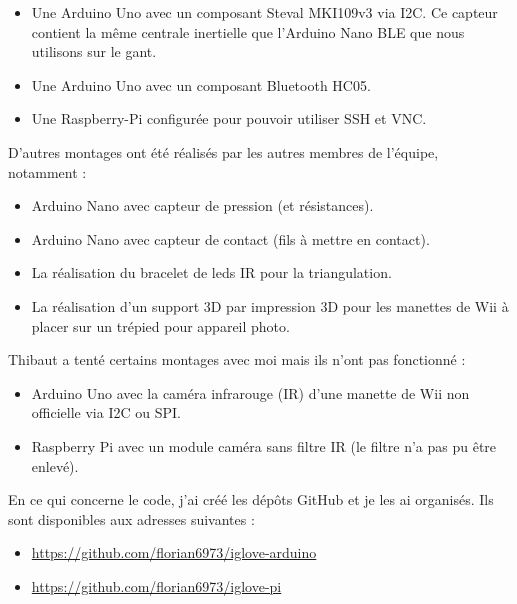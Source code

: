 \documentclass[10pt]{article}
\begin{document}
            \begin{itemize}
                \item Une Arduino Uno avec un composant Steval MKI109v3 via I2C.
                    Ce capteur contient la même centrale inertielle que l'Arduino Nano BLE que nous utilisons sur le gant.
                \item Une Arduino Uno avec un composant Bluetooth HC05.
                \item Une Raspberry-Pi configurée pour pouvoir utiliser SSH et VNC.
            \end{itemize}

            D'autres montages ont été réalisés par les autres membres de l'équipe, notamment :
            \begin{itemize}
                \item Arduino Nano avec capteur de pression (et résistances).
                \item Arduino Nano avec capteur de contact (fils à mettre en contact).
                \item La réalisation du bracelet de leds IR pour la triangulation.
                \item La réalisation d'un support 3D par impression 3D pour les manettes de Wii à placer sur un trépied pour appareil photo.
            \end{itemize}

            Thibaut a tenté certains montages avec moi mais ils n'ont pas fonctionné :
            \begin{itemize}
                \item Arduino Uno avec la caméra infrarouge (IR) d'une manette de Wii non officielle via I2C ou SPI.
                \item Raspberry Pi avec un module caméra sans filtre IR (le filtre n'a pas pu être enlevé).
            \end{itemize}

            En ce qui concerne le code, j'ai créé les dépôts GitHub et je les ai organisés. Ils sont disponibles aux adresses suivantes :
            \begin{itemize}
                \item \url{https://github.com/florian6973/iglove-arduino}
                \item \url{https://github.com/florian6973/iglove-pi}
            \end{itemize} 
            
\end{document}

